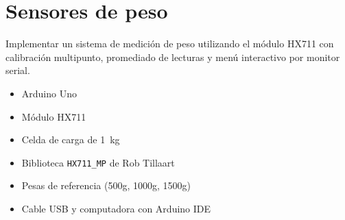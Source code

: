 \chapter{Sensores de peso}
\obj
Implementar un sistema de medición de peso utilizando el módulo HX711 con calibración multipunto, promediado de lecturas y menú interactivo por monitor serial.

\mat
\begin{itemize}
  \item Arduino Uno
  \item Módulo HX711
  \item Celda de carga de \SI{1}{\kilogram}
  \item Biblioteca \texttt{HX711\_MP} de Rob Tillaart
  \item Pesas de referencia (500g, 1000g, 1500g)
  \item Cable USB y computadora con Arduino IDE
\end{itemize}

